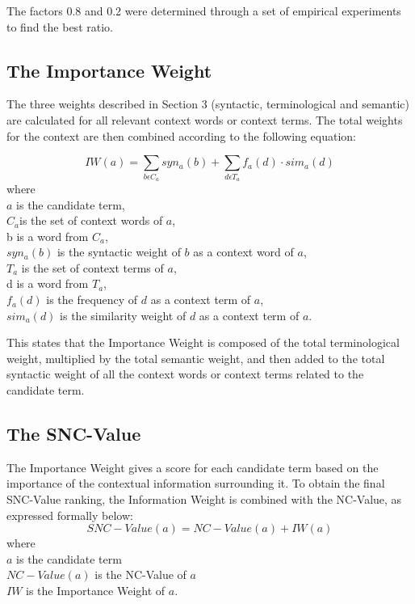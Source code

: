 The factors 0.8 and 0.2 were determined through a set of empirical
experiments to find the best ratio.

\subsection{The Importance Weight}
The three weights described in Section 3 (syntactic, terminological
and semantic) are calculated for all relevant context words or context
terms. The total weights for the context are then combined according
to the following equation:

\begin{equation}\label{IW}
IW(a) = \sum_{b \epsilon C_a} syn_a (b) + \sum_{d\epsilon T_a} f_a(d) \cdot sim_a (d)
\end{equation}
where\\
\indent \(a\) is the candidate term,\\
\indent \(C_a \)is the set of context words of \(a\),\\
\indent b is a word from \(C_a\),\\
\indent \(syn_a (b)\) is the syntactic weight of \(b\) as a context word of \(a\),\\
\indent \(T_a \) is the set of context terms of \(a\),\\
\indent d is a word from \(T_a\),\\
\indent \(f_a (d)\) is the frequency of \(d\) as a context term of \(a\),\\
\indent \(sim_a (d)\) is the similarity weight of \(d\) as a context term of \(a\).
\vspace{\baselineskip}

This states that the Importance Weight is composed of the
total terminological weight, multiplied by the total semantic weight,
and then added to the total syntactic weight of all the context words
or context terms related to the candidate term.

\subsection{The SNC-Value}
The Importance Weight gives a score for each candidate term based on
the importance of the contextual information surrounding it.
To obtain the final SNC-Value ranking, the Information
Weight is combined with the NC-Value, as expressed formally below:
\begin{equation}\label{SNC-Value}
SNC-Value(a) = NC-Value(a) + IW(a)
\end{equation}
where\\
\indent \(a\) is the candidate term\\
\indent \(NC-Value(a)\) is the NC-Value of \(a\)\\
\indent \(IW\) is the Importance Weight of \(a\).
\vspace{\baselineskip}

